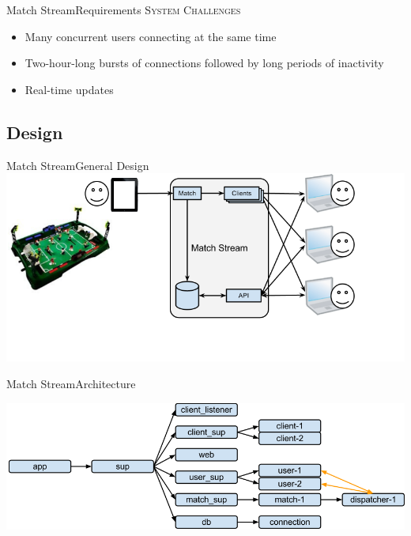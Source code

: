 \documentclass[utf8]{beamer}
\begin{document}
\begin{frame}{Match Stream}{Requirements}
	\textsc{System Challenges}
	\begin{itemize}
		\item<+-> Many concurrent users connecting at the same time
		\item<+-> Two-hour-long bursts of connections followed by long periods of inactivity
		\item<+-> Real-time updates
	\end{itemize}
\end{frame}

\subsection{Design}
\begin{frame}{Match Stream}{General Design}
	\includegraphics[width=\textwidth]{img/MatchStream.png}
\end{frame}
\begin{frame}[t]{Match Stream}{Architecture}
	\begin{center}
		\includegraphics[width=\textwidth]{img/architecture-1.png}
	\end{center}
\end{frame}
\end{document}
